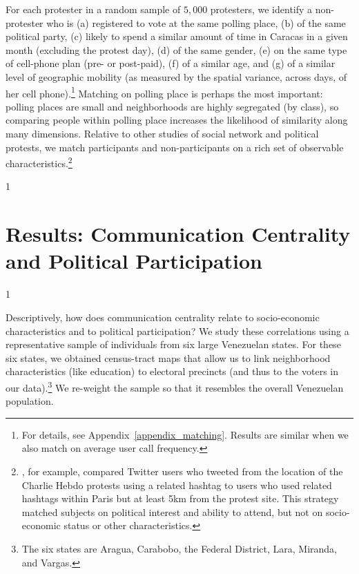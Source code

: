 \documentclass[12pt]{article}
\newcommand{\jop}{0} %
\begin{document}
For each protester in a random sample of $5,000$ protesters, we identify a non-protester who is (a) registered to vote at the same polling place, (b) of the same political party, (c) likely to spend a similar amount of time in Caracas in a given month (excluding the protest day), (d) of the same gender, (e) on the same type of cell-phone plan (pre- or post-paid), (f) of a similar age, and (g) of a similar level of geographic mobility (as measured by the spatial variance, across days, of her cell phone).\footnote{For details, see Appendix~\ref{appendix_matching}. Results are similar when we also match on average user call frequency. } Matching on polling place is perhaps the most important: polling places are small and neighborhoods are highly segregated (by class), so comparing people within polling place increases the likelihood of similarity along many dimensions. Relative to other studies of social network and political protests, we match participants and non-participants on a rich set of observable characteristics.\footnote{\cite{Larson:2016vk}, for example, compared Twitter users who tweeted from the location of the Charlie Hebdo protests using a related hashtag to users who used related hashtags within Paris but at least 5km from the protest site. This strategy matched subjects on political interest and ability to attend, but not on socio-economic status or other characteristics.}






\if\jop1
\linespread{1}\selectfont
\fi
\section{Results: Communication Centrality and Political Participation}\label{sec:results}
\if\jop1
\linespread{2}\selectfont
\fi


Descriptively, how does communication centrality relate to socio-economic characteristics and to political participation? We study these correlations using a representative sample of individuals from six large Venezuelan states. For these six states, we obtained census-tract maps that allow us to link neighborhood characteristics (like education) to electoral precincts (and thus to the voters in our data).\footnote{The six states are Aragua, Carabobo, the Federal District, Lara, Miranda, and Vargas.} We re-weight the sample so that it resembles the overall Venezuelan population.
\end{document}
